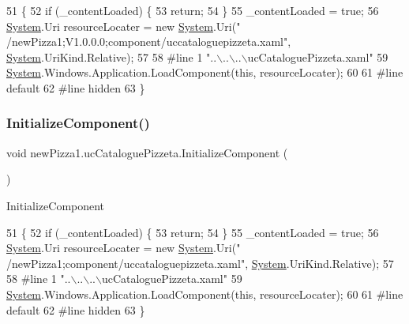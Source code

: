 \begin{DoxyCode}
51                                           \{
52             \textcolor{keywordflow}{if} (\_contentLoaded) \{
53                 \textcolor{keywordflow}{return};
54             \}
55             \_contentLoaded = \textcolor{keyword}{true};
56             \hyperlink{namespaceSystem}{System}.Uri resourceLocater = \textcolor{keyword}{new} \hyperlink{namespaceSystem}{System}.Uri(\textcolor{stringliteral}{"
      /newPizza1;V1.0.0.0;component/uccataloguepizzeta.xaml"}, \hyperlink{namespaceSystem}{System}.UriKind.Relative);
57             
58 \textcolor{preprocessor}{            #line 1 "..\(\backslash\)..\(\backslash\)..\(\backslash\)ucCataloguePizzeta.xaml"}
59             \hyperlink{namespaceSystem}{System}.Windows.Application.LoadComponent(\textcolor{keyword}{this}, resourceLocater);
60             
61 \textcolor{preprocessor}{            #line default}
62 \textcolor{preprocessor}{            #line hidden}
63         \}
\end{DoxyCode}
\mbox{\label{classnewPizza1_1_1ucCataloguePizzeta_afdbc12c0fdebf3e506da6fe56e30af7b}} 
\subsubsection{\texorpdfstring{Initialize\+Component()}{InitializeComponent()}\hspace{0.1cm}{\footnotesize\ttfamily [6/6]}}
{\footnotesize\ttfamily void new\+Pizza1.\+uc\+Catalogue\+Pizzeta.\+Initialize\+Component (\begin{DoxyParamCaption}{ }\end{DoxyParamCaption})\hspace{0.3cm}{\ttfamily [inline]}}



Initialize\+Component 


\begin{DoxyCode}
51                                           \{
52             \textcolor{keywordflow}{if} (\_contentLoaded) \{
53                 \textcolor{keywordflow}{return};
54             \}
55             \_contentLoaded = \textcolor{keyword}{true};
56             \hyperlink{namespaceSystem}{System}.Uri resourceLocater = \textcolor{keyword}{new} \hyperlink{namespaceSystem}{System}.Uri(\textcolor{stringliteral}{"
      /newPizza1;component/uccataloguepizzeta.xaml"}, \hyperlink{namespaceSystem}{System}.UriKind.Relative);
57             
58 \textcolor{preprocessor}{            #line 1 "..\(\backslash\)..\(\backslash\)..\(\backslash\)ucCataloguePizzeta.xaml"}
59             \hyperlink{namespaceSystem}{System}.Windows.Application.LoadComponent(\textcolor{keyword}{this}, resourceLocater);
60             
61 \textcolor{preprocessor}{            #line default}
62 \textcolor{preprocessor}{            #line hidden}
63         \}
\end{DoxyCode}


